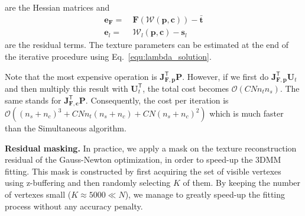 %
are the Hessian matrices and
%
\begin{equation}
\begin{aligned}
\mathbf{e}_{\mathbf{F}} = &~\mathbf{F}\left(\mathcal{W}(\mathbf{p},\mathbf{c})\right) - \bar{\mathbf{t}}\\
\mathbf{e}_l = &~\mathcal{W}_l(\mathbf{p},\mathbf{c}) - \mathbf{s}_l
\end{aligned}
\end{equation}
%
are the residual terms. The texture parameters can be estimated at the end of the iterative procedure using Eq.~\ref{equ:lambda_solution}. 

Note that the most expensive operation is $\mathbf{J}_{\mathbf{F},\mathbf{p}}^\mathsf{T}\mathbf{P}$. However, if we first do $\mathbf{J}_{\mathbf{F},\mathbf{p}}^\mathsf{T}\mathbf{U}_t$ and then multiply this result with $\mathbf{U}_t^\mathsf{T}$, the total cost becomes $\mathcal{O}(CNn_tn_s)$. The same stands for $\mathbf{J}_{\mathbf{F},\mathbf{c}}^\mathsf{T}\mathbf{P}$. Consequently, the cost per iteration is 
$\mathcal{O}((n_s+n_c)^3 + CNn_t(n_s+n_c) + CN(n_s+n_c)^2)$
which is much faster than the Simultaneous algorithm.


%
%
%
\textbf{Residual masking.}
In practice, we apply a mask on the texture reconstruction residual of the Gauss-Newton optimization, in order to speed-up the 3DMM fitting. This mask is constructed by first acquiring the set of visible vertexes using z-buffering and then randomly selecting $K$ of them. By keeping the number of vertexes small ($K\approx 5000 \ll N$), we manage to greatly speed-up the fitting process without any accuracy penalty.
